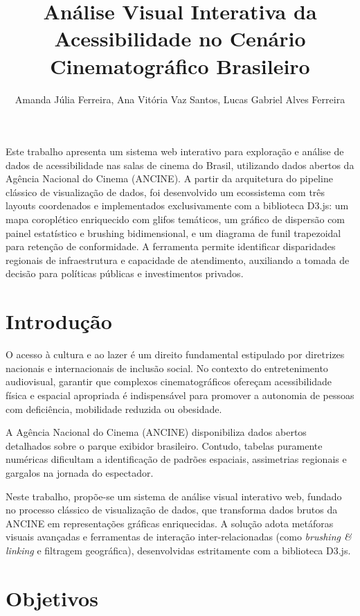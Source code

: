 \documentclass[12pt]{article}
\title{Análise Visual Interativa da Acessibilidade no Cenário Cinematográfico Brasileiro}
\author{Amanda Júlia Ferreira\inst{1}, Ana Vitória Vaz Santos\inst{1}, Lucas Gabriel Alves Ferreira\inst{1}}
\begin{document}
 

\maketitle
     
\begin{resumo} 
  Este trabalho apresenta um sistema web interativo para exploração e análise 
  de dados de acessibilidade nas salas de cinema do Brasil, utilizando dados 
  abertos da Agência Nacional do Cinema (ANCINE). A partir da arquitetura do 
  pipeline clássico de visualização de dados, foi desenvolvido um ecossistema 
  com três layouts coordenados e implementados exclusivamente com a biblioteca 
  D3.js: um mapa coroplético enriquecido com glifos temáticos, um gráfico de 
  dispersão com painel estatístico e brushing bidimensional, e um diagrama de 
  funil trapezoidal para retenção de conformidade. A ferramenta permite 
  identificar disparidades regionais de infraestrutura e capacidade de atendimento, 
  auxiliando a tomada de decisão para políticas públicas e investimentos privados.
\end{resumo}

\section{Introdução}

O acesso à cultura e ao lazer é um direito fundamental estipulado por diretrizes 
nacionais e internacionais de inclusão social. No contexto do entretenimento audiovisual, 
garantir que complexos cinematográficos ofereçam acessibilidade física e espacial 
apropriada é indispensável para promover a autonomia de pessoas com deficiência, 
mobilidade reduzida ou obesidade. 

A Agência Nacional do Cinema (ANCINE) disponibiliza dados abertos detalhados sobre o parque exibidor brasileiro. Contudo, tabelas puramente numéricas dificultam a identificação de padrões espaciais, assimetrias regionais e gargalos na jornada do espectador.

Neste trabalho, propõe-se um sistema de análise visual interativo web, 
fundado no processo clássico de visualização de dados, que transforma dados brutos da ANCINE 
em representações gráficas enriquecidas. A solução adota metáforas visuais avançadas e 
ferramentas de interação inter-relacionadas (como \textit{brushing \& linking} e filtragem geográfica), 
desenvolvidas estritamente com a biblioteca D3.js. 

\section{Objetivos}
\end{document}
